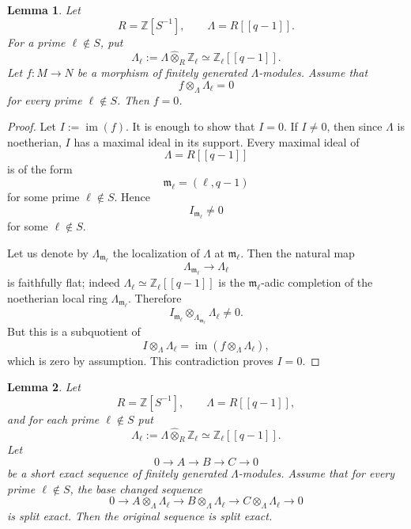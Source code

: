 \documentclass[11pt]{amsart}
\newtheorem{lemma}{Lemma}[section]
\numberwithin{equation}{section}
\newcommand{\Z}{\mathbb{Z}}
\newcommand{\mf}{\mathfrak}
\numberwithin{equation}{section}
\begin{document}

\begin{lemma}\label{qdetect}
Let
\[
  R=\Z[S^{-1}],\qquad
  \Lambda=R[[q-1]].
\]
For a prime $\ell\notin S$, put
\[
  \Lambda_\ell:=\Lambda\widehat\otimes_R\Z_\ell
  \simeq
  \Z_\ell[[q-1]].
\]
Let $f:M\to N$ be a morphism of finitely generated $\Lambda$-modules.
Assume that
\[
  f\otimes_\Lambda \Lambda_\ell=0
\]
for every prime $\ell\notin S$. Then $f=0$.
\end{lemma}

\begin{proof}
Let $I:=\operatorname{im}(f)$. It is enough to show that $I=0$.
If $I\neq 0$, then since $\Lambda$ is noetherian, $I$ has a maximal ideal in
its support. Every maximal ideal of
\[
  \Lambda=R[[q-1]]
\]
is of the form
\[
  \mf{m}_\ell=(\ell,q-1)
\]
for some prime $\ell\notin S$. Hence
\[
  I_{\mf{m}_\ell}\neq 0
\]
for some $\ell\notin S$.

Let us denote by $\Lambda_{\mf{m}_\ell}$ the localization of $\Lambda$ at $\mf{m}_\ell$. Then the natural map
\[
  \Lambda_{\mf{m}_\ell}\longrightarrow \Lambda_\ell
\]
is faithfully flat; indeed $\Lambda_\ell\simeq \Z_\ell[[q-1]]$ is the
$\mf{m}_\ell$-adic completion of the noetherian local ring
$\Lambda_{\mf{m}_\ell}$. Therefore
\[
  I_{\mf{m}_\ell}\otimes_{\Lambda_{\mf{m}_\ell}}\Lambda_\ell
  \neq 0.
\]
But this is a subquotient of
\[
  I\otimes_\Lambda\Lambda_\ell
  =
  \operatorname{im}(f\otimes_\Lambda\Lambda_\ell),
\]
which is zero by assumption. This contradiction proves $I=0$.
\end{proof}


\begin{lemma}\label{qsplitlocal}
Let
\[
  R=\Z[S^{-1}],\qquad
  \Lambda=R[[q-1]],
\]
and for each prime $\ell\notin S$ put
\[
  \Lambda_\ell:=\Lambda\widehat\otimes_R\Z_\ell
  \simeq
  \Z_\ell[[q-1]].
\]
Let
\[
  0\to A\to B\to C\to 0
\]
be a short exact sequence of finitely generated $\Lambda$-modules. Assume
that for every prime $\ell\notin S$, the base changed sequence
\[
  0
  \to
  A\otimes_\Lambda\Lambda_\ell
  \to
  B\otimes_\Lambda\Lambda_\ell
  \to
  C\otimes_\Lambda\Lambda_\ell
  \to
  0
\]
is split exact. Then the original sequence is split exact.
\end{lemma}
\end{document}
